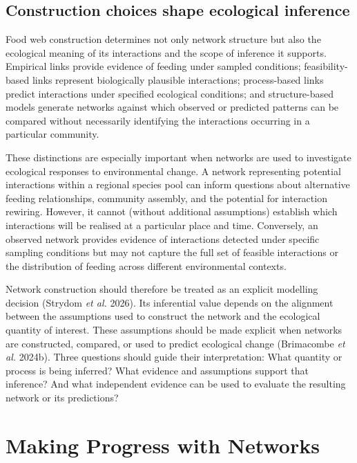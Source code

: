 \documentclass[
]{article}
\begin{document}
\subsection{Construction choices shape ecological
inference}\label{construction-choices-shape-ecological-inference}

Food web construction determines not only network structure but also the
ecological meaning of its interactions and the scope of inference it
supports. Empirical links provide evidence of feeding under sampled
conditions; feasibility-based links represent biologically plausible
interactions; process-based links predict interactions under specified
ecological conditions; and structure-based models generate networks
against which observed or predicted patterns can be compared without
necessarily identifying the interactions occurring in a particular
community.

These distinctions are especially important when networks are used to
investigate ecological responses to environmental change. A network
representing potential interactions within a regional species pool can
inform questions about alternative feeding relationships, community
assembly, and the potential for interaction rewiring. However, it cannot
(without additional assumptions) establish which interactions will be
realised at a particular place and time. Conversely, an observed network
provides evidence of interactions detected under specific sampling
conditions but may not capture the full set of feasible interactions or
the distribution of feeding across different environmental contexts.

Network construction should therefore be treated as an explicit
modelling decision (Strydom \emph{et al.} 2026). Its inferential value
depends on the alignment between the assumptions used to construct the
network and the ecological quantity of interest. These assumptions
should be made explicit when networks are constructed, compared, or used
to predict ecological change (Brimacombe \emph{et al.} 2024b). Three
questions should guide their interpretation: What quantity or process is
being inferred? What evidence and assumptions support that inference?
And what independent evidence can be used to evaluate the resulting
network or its predictions?

\section{Making Progress with Networks}\label{sec-progress}
\end{document}
